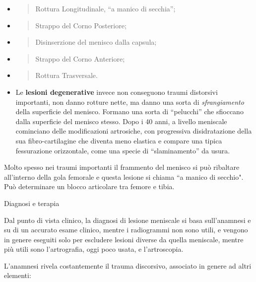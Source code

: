 \documentclass[]{article}
\begin{document}
\begin{itemize}
\item
  \begin{quote}
  Rottura Longitudinale, ``a manico di secchia'';
  \end{quote}
\item
  \begin{quote}
  Strappo del Corno Posteriore;
  \end{quote}
\item
  \begin{quote}
  Disinserzione del menisco dalla capsula;
  \end{quote}
\item
  \begin{quote}
  Strappo del Corno Anteriore;
  \end{quote}
\item
  \begin{quote}
  Rottura Trasversale.
  \end{quote}
\end{itemize}

\begin{itemize}
\item
  Le \textbf{lesioni degenerative} invece non conseguono traumi
  distorsivi importanti, non danno rotture nette, ma danno una sorta di
  \emph{sfrangiamento} della superficie del menisco. Formano una sorta
  di ``pelucchi'' che sfioccano dalla superficie del menisco stesso.
  Dopo i 40 anni, a livello meniscale cominciano delle modificazioni
  artrosiche, con progressiva disidratazione della sua fibro-cartilagine
  che diventa meno elastica e compare una tipica fessurazione
  orizzontale, come una specie di ``slaminamento'' da usura.
\end{itemize}

Molto spesso nei traumi importanti il frammento del menisco si può
ribaltare all'interno della gola femorale e questa lesione si chiama ``a
manico di secchio". Può determinare un blocco articolare tra femore e
tibia.

Diagnosi e terapia

Dal punto di vista clinico, la diagnosi di lesione meniscale si basa
sull'anamnesi e su di un accurato esame clinico, mentre i radiogrammi
non sono utili, e vengono in genere eseguiti solo per escludere lesioni
diverse da quella meniscale, mentre più utili sono l'artrografia, oggi
poco usata, e l'artroscopia.

L'anamnesi rivela costantemente il trauma discorsivo, associato in
genere ad altri elementi:
\end{document}
